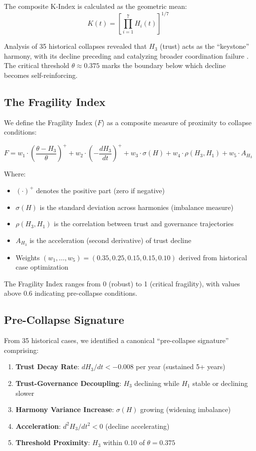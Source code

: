 \documentclass[11pt,a4paper]{article}
\begin{document}
The composite K-Index is calculated as the geometric mean:
\begin{equation}
K(t) = \left[\prod_{i=1}^{7} H_i(t)\right]^{1/7}
\end{equation}

Analysis of 35 historical collapses revealed that $H_3$ (trust) acts as the ``keystone'' harmony, with its decline preceding and catalyzing broader coordination failure \citep{Paper2}. The critical threshold $\theta \approx 0.375$ marks the boundary below which decline becomes self-reinforcing.

\subsection{The Fragility Index}

We define the Fragility Index ($F$) as a composite measure of proximity to collapse conditions:

\begin{equation}
F = w_1 \cdot \left(\frac{\theta - H_3}{\theta}\right)^+ + w_2 \cdot \left(-\frac{dH_3}{dt}\right)^+ + w_3 \cdot \sigma(H) + w_4 \cdot \rho(H_3, H_1) + w_5 \cdot A_{H_3}
\end{equation}

Where:
\begin{itemize}
\item $(\cdot)^+$ denotes the positive part (zero if negative)
\item $\sigma(H)$ is the standard deviation across harmonies (imbalance measure)
\item $\rho(H_3, H_1)$ is the correlation between trust and governance trajectories
\item $A_{H_3}$ is the acceleration (second derivative) of trust decline
\item Weights $(w_1, \ldots, w_5) = (0.35, 0.25, 0.15, 0.15, 0.10)$ derived from historical case optimization
\end{itemize}

The Fragility Index ranges from 0 (robust) to 1 (critical fragility), with values above 0.6 indicating pre-collapse conditions.

\subsection{Pre-Collapse Signature}

From 35 historical cases, we identified a canonical ``pre-collapse signature'' comprising:

\begin{enumerate}
\item \textbf{Trust Decay Rate}: $dH_3/dt < -0.008$ per year (sustained 5+ years)
\item \textbf{Trust-Governance Decoupling}: $H_3$ declining while $H_1$ stable or declining slower
\item \textbf{Harmony Variance Increase}: $\sigma(H)$ growing (widening imbalance)
\item \textbf{Acceleration}: $d^2H_3/dt^2 < 0$ (decline accelerating)
\item \textbf{Threshold Proximity}: $H_3$ within 0.10 of $\theta = 0.375$
\end{enumerate}
\end{document}
